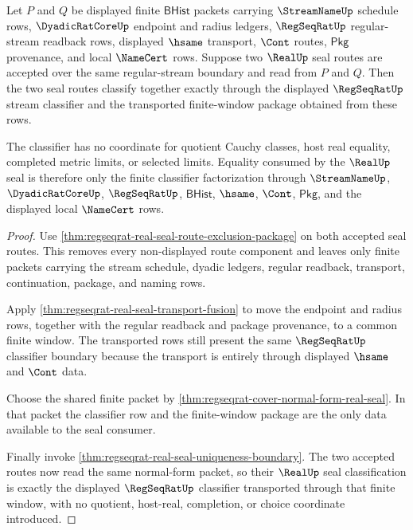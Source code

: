 \begin{theorem}
\label{thm:regseqrat-real-seal-classifier-factorization}
Let $P$ and $Q$ be displayed finite $\mathsf{BHist}$ packets carrying
$\StreamNameUp$ schedule rows, $\DyadicRatCoreUp$ endpoint and radius ledgers,
$\RegSeqRatUp$ regular-stream readback rows, displayed $\hsame$ transport,
$\Cont$ routes, $\mathsf{Pkg}$ provenance, and local $\NameCert$ rows. Suppose
two $\RealUp$ seal routes are accepted over the same regular-stream boundary
and read from $P$ and $Q$. Then the two seal routes classify together exactly
through the displayed $\RegSeqRatUp$ stream classifier and the transported
finite-window package obtained from these rows.

The classifier has no coordinate for quotient Cauchy classes, host real
equality, completed metric limits, or selected limits. Equality consumed by the
$\RealUp$ seal is therefore only the finite classifier factorization through
$\StreamNameUp$, $\DyadicRatCoreUp$, $\RegSeqRatUp$, $\mathsf{BHist}$,
$\hsame$, $\Cont$, $\mathsf{Pkg}$, and the displayed local $\NameCert$ rows.
\end{theorem}
\begin{proof}
Use \autoref{thm:regseqrat-real-seal-route-exclusion-package} on both accepted
seal routes. This removes every non-displayed route component and leaves only
finite packets carrying the stream schedule, dyadic ledgers, regular readback,
transport, continuation, package, and naming rows.

Apply \autoref{thm:regseqrat-real-seal-transport-fusion} to move the endpoint
and radius rows, together with the regular readback and package provenance, to
a common finite window. The transported rows still present the same
$\RegSeqRatUp$ classifier boundary because the transport is entirely through
displayed $\hsame$ and $\Cont$ data.

Choose the shared finite packet by
\autoref{thm:regseqrat-cover-normal-form-real-seal}. In that packet the
classifier row and the finite-window package are the only data available to the
seal consumer.

Finally invoke \autoref{thm:regseqrat-real-seal-uniqueness-boundary}. The two
accepted routes now read the same normal-form packet, so their $\RealUp$ seal
classification is exactly the displayed $\RegSeqRatUp$ classifier transported
through that finite window, with no quotient, host-real, completion, or choice
coordinate introduced.
\end{proof}

